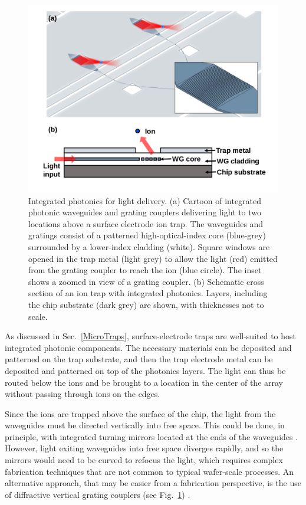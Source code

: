 \documentclass[%
reprint,
 amsmath,amssymb,
]{revtex4-1}
\begin{document}
\begin{figure}[t b h]
\includegraphics[width=2.0\columnwidth]{IntegratedPhotonics_v2.pdf}
\caption{Integrated photonics for light delivery.  (a) Cartoon of integrated photonic waveguides and grating couplers delivering light to two locations above a surface electrode ion trap.  The waveguides and gratings consist of a patterned high-optical-index core (blue-grey) surrounded by a lower-index cladding (white).  Square windows are opened in the trap metal (light grey) to allow the light (red) emitted from the grating coupler to reach the ion (blue circle).  The inset shows a zoomed in view of a grating coupler. (b) Schematic cross section of an ion trap with integrated photonics.  Layers, including the chip substrate (dark grey) are shown, with thicknesses not to scale.}
\label{fig:intphot}
\end{figure}

As discussed in Sec.~\ref{MicroTraps}, surface-electrode traps are well-suited to host integrated photonic components.  The necessary materials can be deposited and patterned on the trap substrate, and then the trap electrode metal can be deposited and patterned on top of the photonics layers.  The light can thus be routed below the ions and be brought to a location in the center of the array without passing through ions on the edges.

Since the ions are trapped above the surface of the chip, the light from the waveguides must be directed vertically into free space.  This could be done, in principle, with integrated turning mirrors located at the ends of the waveguides \cite{TangTurningmirror2002}.  However, light exiting waveguides into free space diverges rapidly, and so the mirrors would need to be curved to refocus the light, which requires complex fabrication techniques that are not common to typical wafer-scale processes.  An alternative approach, that may be easier from a fabrication perspective, is the use of diffractive vertical grating couplers (see Fig.~\ref{fig:intphot}) \cite{MehtaIntegrated2016,MehtaThesis2017}.
\end{document}
